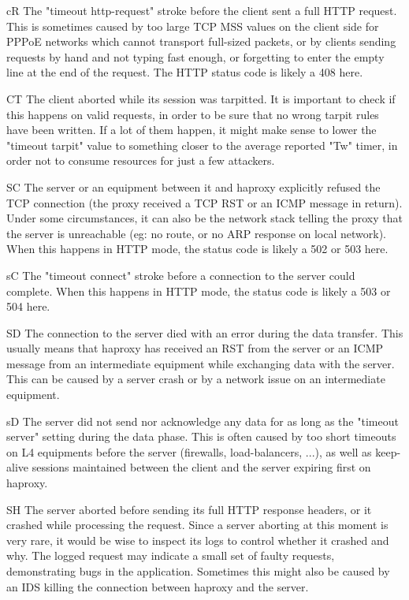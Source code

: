     cR   The "timeout http-request" stroke before the client sent a full HTTP
          request. This is sometimes caused by too large TCP MSS values on the
          client side for PPPoE networks which cannot transport full-sized
          packets, or by clients sending requests by hand and not typing fast
          enough, or forgetting to enter the empty line at the end of the
          request. The HTTP status code is likely a 408 here.

     CT   The client aborted while its session was tarpitted. It is important to
          check if this happens on valid requests, in order to be sure that no
          wrong tarpit rules have been written. If a lot of them happen, it
          might make sense to lower the "timeout tarpit" value to something
          closer to the average reported "Tw" timer, in order not to consume
          resources for just a few attackers.

     SC   The server or an equipment between it and haproxy explicitly refused
          the TCP connection (the proxy received a TCP RST or an ICMP message
          in return). Under some circumstances, it can also be the network
          stack telling the proxy that the server is unreachable (eg: no route,
          or no ARP response on local network). When this happens in HTTP mode,
          the status code is likely a 502 or 503 here.

     sC   The "timeout connect" stroke before a connection to the server could
          complete. When this happens in HTTP mode, the status code is likely a
          503 or 504 here.

     SD   The connection to the server died with an error during the data
          transfer. This usually means that haproxy has received an RST from
          the server or an ICMP message from an intermediate equipment while
          exchanging data with the server. This can be caused by a server crash
          or by a network issue on an intermediate equipment.

     sD   The server did not send nor acknowledge any data for as long as the
          "timeout server" setting during the data phase. This is often caused
          by too short timeouts on L4 equipments before the server (firewalls,
          load-balancers, ...), as well as keep-alive sessions maintained
          between the client and the server expiring first on haproxy.

     SH   The server aborted before sending its full HTTP response headers, or
          it crashed while processing the request. Since a server aborting at
          this moment is very rare, it would be wise to inspect its logs to
          control whether it crashed and why. The logged request may indicate a
          small set of faulty requests, demonstrating bugs in the application.
          Sometimes this might also be caused by an IDS killing the connection
          between haproxy and the server.

